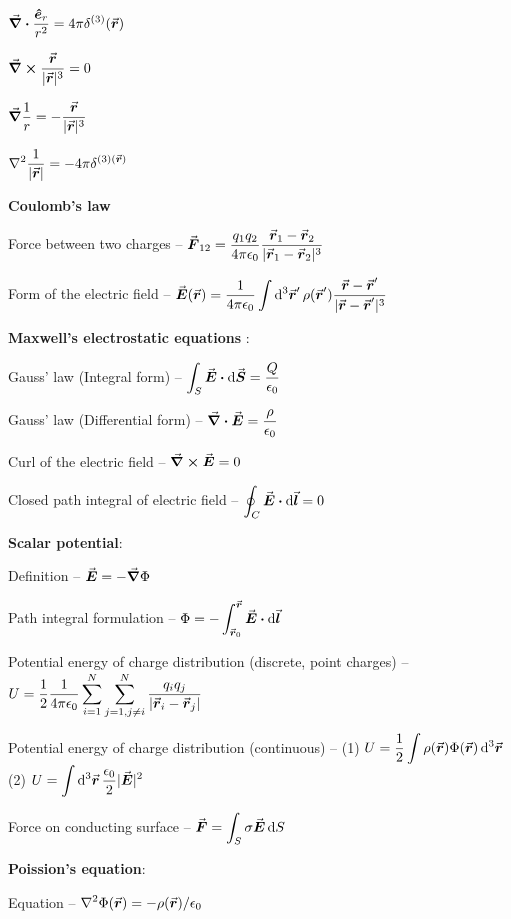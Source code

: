 $\displaystyle \div{ \frac{\vu*{e}_{r}}{r^2} } = 4 \pi \delta^{(3)}(\va*{r})$

$\displaystyle \curl{ \frac{\va*{r}}{|\va*{r}|^3} } = 0$

$\displaystyle \grad \frac{1}{r} = -\frac{\va*{r}}{|\va*{r}|^3}$

$\displaystyle \laplacian \frac{1}{|\va*{r}|} = -4\pi \delta^{(3)(\va*{r})}$

\textbf{Coulomb's law}

Force between two charges -- $\displaystyle \va*{F}_{12} = \frac{q_1 q_2}{4 \pi \epsilon_0} \frac{\va*{r}_{1} - \va*{r}_{2}}{|\va*{r}_{1} - \va*{r}_{2}|^3}$

Form of the electric field -- $\displaystyle \va*{E}(\va*{r}) = \frac{1}{4 \pi \epsilon_0} \int \dd[3]{\va*{r}'} \rho(\va*{r}') \frac{\va*{r} - \va*{r}'}{|\va*{r} - \va*{r}'|^3}$

\textbf{Maxwell's electrostatic equations }:

Gauss' law (Integral form) -- $\displaystyle \int_{S} \va*{E} \vdot \dd{\va*{S}} = \frac{Q}{\epsilon_0}$

Gauss' law (Differential form) -- $\displaystyle \div{\va*{E}} = \frac{\rho}{\epsilon_0}$

Curl of the electric field -- $\curl{ \va*{E} } = 0$

Closed path integral of electric field -- $\displaystyle \oint_{C} \va*{E} \vdot \dd{\va*{l}} = 0$

\textbf{Scalar potential}:

Definition -- $\va*{E} = -\grad \Phi$

Path integral formulation -- $\displaystyle \Phi = - \int_{\va*{r}_{0}}^{\va*{r}} \va*{E} \vdot \dd{\va*{l}}$

Potential energy of charge distribution (discrete, point charges) -- $\displaystyle U = \frac{1}{2} \frac{1}{4 \pi \epsilon_0} \sum_{i=1}^{N} \sum_{j=1,j \ne i}^{N} \frac{q_{i} q_{j}}{|\va*{r}_{i} - \va*{r}_{j}|}$

Potential energy of charge distribution (continuous) -- (1) $\displaystyle U = \frac{1}{2} \int \rho(\va*{r}) \Phi(\va*{r}) \dd[3]{\va*{r}}$ (2) $\displaystyle U = \int \dd[3]{\va*{r}} \frac{\epsilon_0}{2} |\va*{E}|^2$

Force on conducting surface -- $\displaystyle \va*{F} = \int_{S} \sigma \va*{E} \dd{S}$

\textbf{Poission's equation}:

Equation -- $\displaystyle \laplacian \Phi(\va*{r}) = -\rho(\va*{r}) / \epsilon_0$

